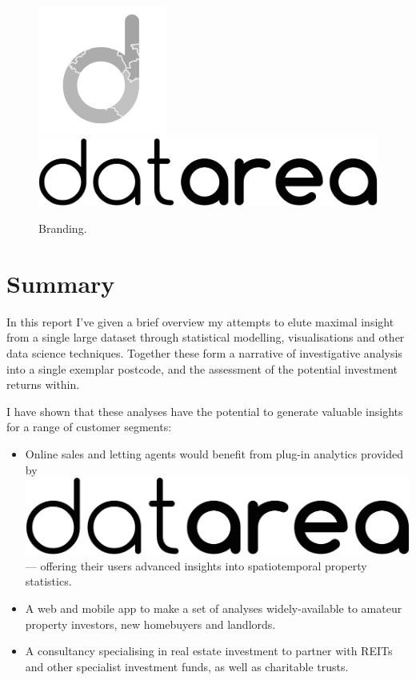 \documentclass[
10pt, %
a4paper, %
oneside, %
headinclude,footinclude, %
BCOR5mm, %
]{scrartcl}
\newcommand*{\logo}{\includegraphics[scale=.04]{Figures/logotext.png}}
\begin{document}
\begin{figure}
\vspace{5em}
\centering
\includegraphics[width=.2\textwidth]{Figures/logo.png}
\includegraphics[width=.2\textwidth]{Figures/logotext.png}
\caption{ Branding. }
\end{figure}

\section*{Summary}

In this report I've given a brief overview my attempts to elute
maximal insight from a single large dataset through statistical
modelling, visualisations and other data science techniques. Together
these form a narrative of investigative analysis into a single
exemplar postcode, and the assessment of the potential investment
returns within.

I have shown that these analyses have the potential to generate
valuable insights for a range of customer segments:

\begin{itemize}

\item Online sales and letting agents would benefit from
plug-in analytics provided by \logo \hspace{.1em} --- offering their
users advanced insights into spatiotemporal property statistics.

\item A web and mobile app to make a set of analyses widely-available
  to amateur property investors, new homebuyers and landlords.

\item A consultancy specialising in real estate investment to partner
  with REITs and other specialist investment funds, as well as
  charitable trusts.
\end{itemize}
\end{document}
